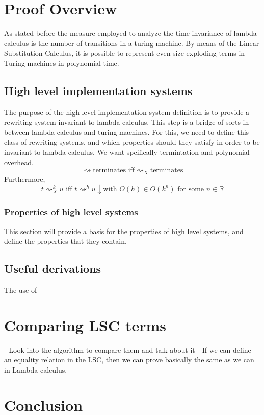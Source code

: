 \documentclass[12pt]{article}
\begin{document}
\section{Proof Overview}
As stated before the measure employed to analyze the time invariance of lambda calculus is the number of transitions in a turing machine. By means of the Linear Substitution Calculus, it is possible to represent even size-exploding terms in Turing machines in polynomial time.
\subsection{High level implementation systems}
The purpose of the high level implementation system definition is to provide a rewriting system invariant to lambda calculus. This step is a bridge of sorts in between lambda calculus and turing machines. For this, we need to define this class of rewriting systems, and which properties should they satisfy in order to be invariant to lambda calculus. We want spcifically termintation and polynomial overhead.
$$\rightsquigarrow \text{terminates iff} {\rightsquigarrow}_{X} \text{terminates}$$
Furthermore,
$$t {\rightsquigarrow}_{X}^k u \text{ iff } t {\rightsquigarrow}^h u\downarrow \text{with } O(h) \in O(k^n) \text{ for some } n \in \mathbb{R} $$
\subsubsection{Properties of high level systems}
This section will provide a basis for the properties of high level systems, and define the properties that they contain.
\subsection{Useful derivations}
The use of
\section{Comparing LSC terms}
- Look into the algorithm to compare them and talk about it
- If we can define an equality relation in the LSC, then we can prove basically the same as we can in Lambda calculus.
\section{Conclusion}
\printbibliography
\end{document}
